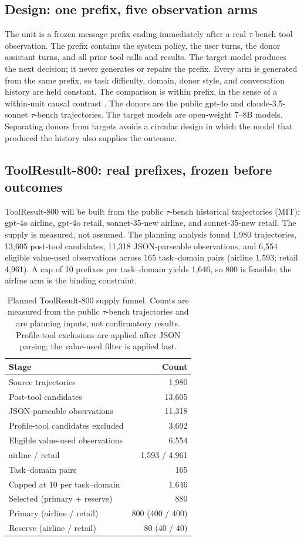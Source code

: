 \documentclass[11pt,a4paper]{article}
\begin{document}
\subsection{Design: one prefix, five observation arms}
The unit is a frozen message prefix ending immediately after a real $\tau$-bench tool observation.
The prefix contains the system policy, the user turns, the donor assistant turns, and all prior tool
calls and results. The target model produces the next decision; it never generates or repairs the
prefix. Every arm is generated from the same prefix, so task difficulty, domain, donor style, and
conversation history are held constant. The comparison is within prefix, in the sense of a
within-unit causal contrast \cite{causal}. The donors are the public gpt-4o and claude-3.5-sonnet
$\tau$-bench trajectories. The target models
are open-weight 7--8B models. Separating donors from targets avoids a circular design in which the
model that produced the history also supplies the outcome.

\subsection{ToolResult-800: real prefixes, frozen before outcomes}
ToolResult-800 will be built from the public $\tau$-bench historical trajectories (MIT): gpt-4o airline,
gpt-4o retail, sonnet-35-new airline, and sonnet-35-new retail. The supply is measured, not assumed.
The planning analysis found 1,980 trajectories, 13,605 post-tool candidates, 11,318 JSON-parseable
observations, and 6,554 eligible value-used observations across 165 task--domain pairs (airline
1,593; retail 4,961). A cap of 10 prefixes per task--domain yields 1,646, so 800 is feasible; the
airline arm is the binding constraint.

\begin{table}[h]
\centering
\small
\caption{Planned ToolResult-800 supply funnel. Counts are measured from the public $\tau$-bench
trajectories and are planning inputs, not confirmatory results. Profile-tool exclusions are applied
after JSON parsing; the value-used filter is applied last.}
\label{tab:supply}
\begin{tabular}{@{}lr@{}}
\toprule
Stage & Count \\
\midrule
Source trajectories & 1,980 \\
Post-tool candidates & 13,605 \\
JSON-parseable observations & 11,318 \\
Profile-tool candidates excluded & 3,692 \\
Eligible value-used observations & 6,554 \\
\quad airline / retail & 1,593 / 4,961 \\
Task--domain pairs & 165 \\
Capped at 10 per task--domain & 1,646 \\
Selected (primary + reserve) & 880 \\
Primary (airline / retail) & 800 (400 / 400) \\
Reserve (airline / retail) & 80 (40 / 40) \\
\bottomrule
\end{tabular}
\end{table}
\end{document}
